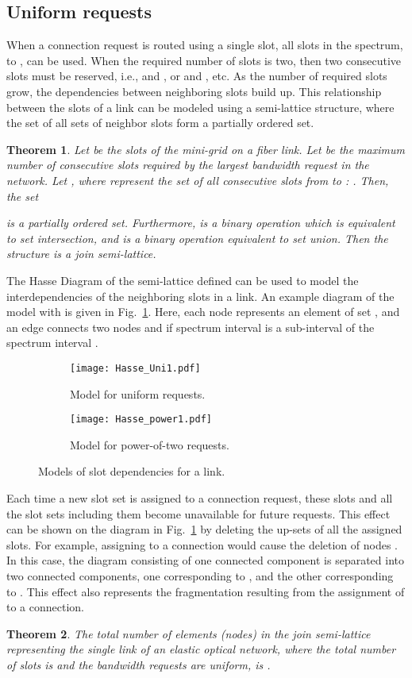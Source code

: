 \documentclass[letterpaper,10pt]{article}\pdfoutput=1
\newtheorem{theorem}{Theorem}
\begin{document}
\subsection{Uniform requests}
When a connection request is routed using a single slot, all slots in the spectrum,  to , 
can be used.
When the required number of slots is two, then two consecutive slots must be reserved, i.e.,  and , or 
 and , etc. As the number of required slots grow, the dependencies between neighboring slots build up.
This relationship between the slots of a link can be modeled using a semi-lattice structure, where the 
set of all sets of neighbor slots form a partially ordered set. 
\begin{theorem}Let  be the slots of the mini-grid on a fiber link. 
Let  be the maximum number of consecutive slots required by the largest bandwidth request in the network.
Let , where  represent the set of all consecutive slots from  to : 
.
Then, the set

is a partially ordered set. Furthermore,  is a binary operation which is equivalent to set intersection, 
and  is a binary operation equivalent to set union. 
Then the structure  is a join semi-lattice.
\end{theorem}
The Hasse Diagram of the semi-lattice defined can be used to model the interdependencies of the neighboring slots
in a link. An example diagram of the model with  is given in Fig.~\ref{Hasse:uniform1}. Here, 
each node represents an element of set , and an edge connects two nodes  and  
if spectrum interval  is a sub-interval of the spectrum interval .
\begin{figure}[t]
\centering
\begin{subfigure}{0.49\textwidth}
\centering
\texttt{[image: Hasse\_Uni1.pdf]}
\caption{Model for uniform requests. }
\label{Hasse:uniform1}
\end{subfigure}
\begin{subfigure}{0.49\textwidth}
\centering
\texttt{[image: Hasse\_power1.pdf]}
\caption{Model for power-of-two requests. }
\label{Hasse:power1}
\end{subfigure}
\vspace{-0.5cm}
\caption{Models of slot dependencies for a link.}
\vspace{-0.8cm}
\end{figure}
Each time a new slot set is assigned to a connection request, these slots and all the slot sets
including them become unavailable for future requests. This effect can be shown on the diagram in 
Fig.~\ref{Hasse:uniform1} by deleting the up-sets of all the assigned slots. For example, assigning  to
a connection would cause the deletion of nodes . In this case,
the diagram consisting of one connected component is separated into two connected components, one corresponding
to , and the other corresponding to . This effect also represents 
the fragmentation resulting from the assignment of  to a connection.
\begin{theorem}The total number of elements (nodes) in the join semi-lattice  representing the single link of an
elastic optical network, where the total number of slots is  and the bandwidth requests are uniform, is
.
\end{theorem}
\end{document}
